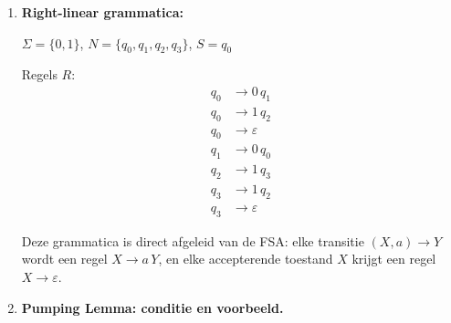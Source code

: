 \documentclass[11pt]{article}
\begin{document}
\begin{enumerate}
\begin{enumerate}
\begin{center}
\end{center}

Toestanden:
\begin{itemize}
\item $q_0$: starttoestand (accepterend). Even aantal 0'en gelezen, nog geen 1'en.
\item $q_1$: oneven aantal 0'en gelezen.
\item $q_2$: even aantal 0'en klaar, oneven aantal 1'en gelezen.
\item $q_3$: accepterend. Even aantal 0'en klaar, even aantal 1'en gelezen ($\geq 2$).
\end{itemize}

Opmerking: niet-getoonde overgangen leiden naar een impliciete dode toestand (bijv.\ een~1 lezen in $q_1$, of een~0 lezen in $q_2$ of~$q_3$).

\item \textbf{Right-linear grammatica:}

$\Sigma = \{0, 1\}$, \quad $N = \{q_0, q_1, q_2, q_3\}$, \quad $S = q_0$

Regels $R$:
\begin{align*}
q_0 &\to 0\, q_1 \\
q_0 &\to 1\, q_2 \\
q_0 &\to \varepsilon \\
q_1 &\to 0\, q_0 \\
q_2 &\to 1\, q_3 \\
q_3 &\to 1\, q_2 \\
q_3 &\to \varepsilon
\end{align*}

Deze grammatica is direct afgeleid van de FSA: elke transitie $(X, a) \to Y$ wordt een regel $X \to a\,Y$, en elke accepterende toestand $X$ krijgt een regel $X \to \varepsilon$.

\item \textbf{Pumping Lemma: conditie en voorbeeld.}


\end{enumerate}
\end{enumerate}
\end{document}
